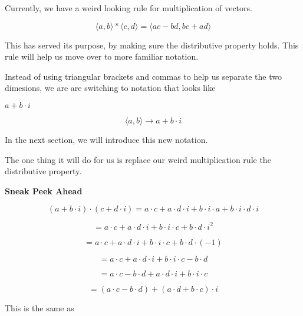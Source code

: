 \documentclass{ximera}
\begin{document}
Currently, we have a weird looking rule for multiplication of vectors.



\[    \langle a, b \rangle  * \langle c, d \rangle =   \langle a c - b d, b c + a d \rangle   \]



This has served its purpose, by making sure the distributive property holds.  This rule will help us move over to more familiar notation.


Instead of using triangular brackets and commas to help us separate the two dimesions, we are are switching to notation that looks like 






\begin{center}
\textbf{\textcolor{blue!55!black}{$a + b \cdot i$}} 
\end{center}




\[    \langle a, b \rangle  \rightarrow   a + b \cdot i   \]






In the next section, we will introduce this new notation.  

The one thing it will do for us is replace our weird multiplication rule the distributive property.



\begin{idea} \textbf{Sneak Peek Ahead}

\[    (a + b \cdot i) \cdot (c + d \cdot i) = a \cdot c + a \cdot d \cdot i + b \cdot i \cdot a +  b \cdot i \cdot d \cdot i \]


\[    = a \cdot c + a \cdot d \cdot i + b \cdot i \cdot c +  b \cdot d \cdot i^2 \]

\[    = a \cdot c + a \cdot d \cdot i + b \cdot i \cdot c +  b \cdot d \cdot (-1) \]

\[    = a \cdot c + a \cdot d \cdot i + b \cdot i \cdot c -  b \cdot d  \]

\[    = a \cdot c -  b \cdot d + a \cdot d \cdot i + b \cdot i \cdot c   \]

\[    = (a \cdot c -  b \cdot d) + (a \cdot d  + b \cdot c) \cdot i   \]



\end{idea}



This is the same as
\end{document}
